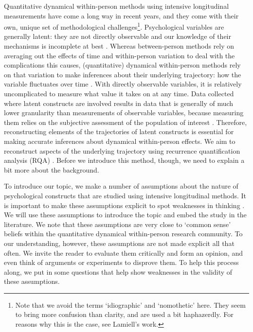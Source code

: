 \documentclass[utf8]{FrontiersinVancouver}
\begin{document}
Quantitative dynamical within-person methods using intensive longitudinal measurements have come a long way in recent years, and they come with their own, unique set of methodological challenges\footnote{Note that we avoid the terms `idiographic' and `nomothetic' here. They seem to bring more confusion than clarity, and are used a bit haphazerdly. For reasons why this is the case, see Lamiell's work\citep{lamiellNomotheticIdiographicContrasting1998}.}. Psychological variables are generally latent: they are not directly observable and our knowledge of their mechanisms is incomplete at best \citep{bollenLatentVariablesPsychology2002}. Whereas between-person methods rely on averaging out the effects of time and within-person variation to deal with the complications this causes, (quantitative) dynamical within-person methods rely on that variation to make inferences about their underlying trajectory: how the variable fluctuates over time \citep{molenaarManifestoPsychologyIdiographic2004,molenaarNewPersonSpecificParadigm2009,lamiellStatisticalThinkingPsychology2019}. With directly observable variables, it is relatively uncomplicated to measure what value it takes on at any time. Data collected where latent constructs are involved results in data that is generally of much lower granularity than measurements of observable variables, because measuring them relies on the subjective assessment of the population of interest \citep{borsboomLatentVariableTheory2008}. Therefore, reconstructing elements of the trajectories of latent constructs is essential for making accurate inferences about dynamical within-person effects. We aim to reconstruct aspects of the underlying trajectory using recurrence quantification analysis (RQA) \citep{webber2005recurrence}. Before we introduce this method, though, we need to explain a bit more about the background.

To introduce our topic, we make a number of assumptions about the nature of psychological constructs that are studied using intensive longitudinal methods. It is important to make these assumptions explicit to spot weaknesses in thinking \citep{meehlTheoreticalRisksTabular2004}. We will use these assumptions to introduce the topic and embed the study in the literature. We note that these assumptions are very close to `common sense' beliefs within the quantitative dynamical within-person research community. To our understanding, however, these assumptions are not made explicit all that often. We invite the reader to evaluate them critically and form an opinion, and even think of arguments or experiments to disprove them. To help this process along, we put in some questions that help show weaknesses in the validity of these assumptions. 
\end{document}
